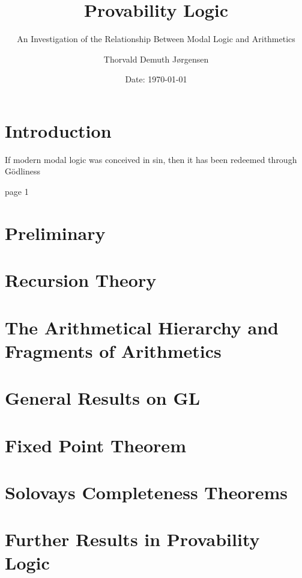 \documentclass[12pt,a4paper,dvipsnames,bibliography=totocnumbered]{scrbook}
\author{Thorvald Demuth Jørgensen}
\title{Provability Logic}
\subtitle{An Investigation of the Relationship Between Modal Logic and
Arithmetics}
\date{Date: {\today}}
\theoremstyle{dotlessS}
\theoremstyle{dotlessS}
\theoremstyle{dotlessS}
\theoremstyle{dotlessS}
\theoremstyle{dotlessS}
\theoremstyle{dotlessS}
\theoremstyle{dotlessS}
\newcommand{\0}{\overline{0}}
\newcommand{\1}{\raisebox{\dimexpr1.79ex- \height}{$1$}}
\begin{document}
\maketitle
\tableofcontents
\newpage


\chapter{Introduction}
\epigraph{If modern modal logic was conceived in sin, then it has been redeemed
through Gödliness}{\cite{Boolos1979} page 1}
\label{chap:intro}


\chapter{Preliminary}
\label{chap:Pre}


\chapter{Recursion Theory}
\label{chap:Recur}


\chapter{The Arithmetical Hierarchy and Fragments of Arithmetics}
\label{chap:PRA}


\chapter{General Results on GL}
\label{chap:GL}


\chapter{Fixed Point Theorem}
\label{chap:Fixed}


\chapter{Solovays Completeness Theorems}
\label{chap:Complete}


\chapter{Further Results in Provability Logic}
\label{chap:Further}


\nocite{*}
\printbibliography

\appendix

\end{document}
